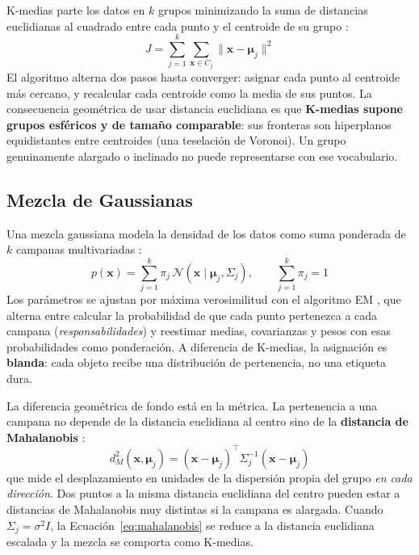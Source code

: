 \documentclass[10pt,journal]{IEEEtran}
\begin{document}
  K-medias parte los datos en $k$ grupos minimizando la suma de distancias euclidianas al cuadrado entre cada punto y el centroide de su grupo \cite{macqueen1967,lloyd1982}:
  \begin{equation}
    J = \sum_{j=1}^{k} \sum_{\mathbf{x} \in C_j} \lVert \mathbf{x} - \boldsymbol{\mu}_j \rVert^2
    \label{eq:kmeans}
  \end{equation}
  El algoritmo alterna dos pasos hasta converger: asignar cada punto al centroide m\'as cercano, y recalcular cada centroide como la media de sus puntos. La consecuencia geom\'etrica de usar distancia euclidiana es que \textbf{K-medias supone grupos esf\'ericos y de tama\~no comparable}: sus fronteras son hiperplanos equidistantes entre centroides (una teselaci\'on de Voronoi). Un grupo genuinamente alargado o inclinado no puede representarse con ese vocabulario.

  \subsection{Mezcla de Gaussianas}

  Una mezcla gaussiana modela la densidad de los datos como suma ponderada de $k$ campanas multivariadas \cite{mclachlan2000}:
  \begin{equation}
    p(\mathbf{x}) = \sum_{j=1}^{k} \pi_j \, \mathcal{N}(\mathbf{x} \mid \boldsymbol{\mu}_j, \Sigma_j), \qquad \sum_{j=1}^{k} \pi_j = 1
    \label{eq:gmm}
  \end{equation}
  Los par\'ametros se ajustan por m\'axima verosimilitud con el algoritmo EM \cite{dempster1977,hastie2009}, que alterna entre calcular la probabilidad de que cada punto pertenezca a cada campana (\emph{responsabilidades}) y reestimar medias, covarianzas y pesos con esas probabilidades como ponderaci\'on. A diferencia de K-medias, la asignaci\'on es \textbf{blanda}: cada objeto recibe una distribuci\'on de pertenencia, no una etiqueta dura.

  La diferencia geom\'etrica de fondo est\'a en la m\'etrica. La pertenencia a una campana no depende de la distancia euclidiana al centro sino de la \textbf{distancia de Mahalanobis} \cite{mahalanobis1936}:
  \begin{equation}
    d_M^2(\mathbf{x}, \boldsymbol{\mu}_j) = (\mathbf{x} - \boldsymbol{\mu}_j)^{\top} \Sigma_j^{-1} (\mathbf{x} - \boldsymbol{\mu}_j)
    \label{eq:mahalanobis}
  \end{equation}
  que mide el desplazamiento en unidades de la dispersi\'on propia del grupo \emph{en cada direcci\'on}. Dos puntos a la misma distancia euclidiana del centro pueden estar a distancias de Mahalanobis muy distintas si la campana es alargada. Cuando $\Sigma_j = \sigma^2 I$, la Ecuaci\'on~\ref{eq:mahalanobis} se reduce a la distancia euclidiana escalada y la mezcla se comporta como K-medias.
\end{document}
